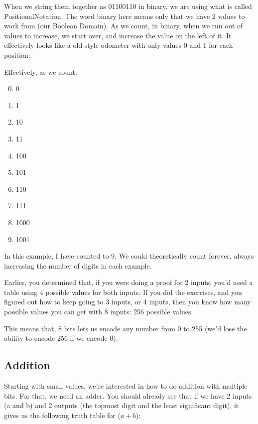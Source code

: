 When we string them together as 01100110 in binary, we are using what is called \gls{PositionalNotation}. The word binary here means only that we have 2 values to work from (our Boolean Domain). As we count, in binary, when we run out of values to increase, we start over, and increase the value on the left of it. It effectively looks like a old-style odometer with only values 0 and 1 for each position:


\begin{samepage}

Effectively, as we count:
\begin{enumerate}
    \setcounter{enumi}{-1}
    \item 0
    \item 1
    \item 10
    \item 11
    \item 100
    \item 101
    \item 110
    \item 111
    \item 1000
    \item 1001
\end{enumerate}

In this example, I have counted to 9. We could theoretically count forever, always increasing the number of digits in each example.
\end{samepage}

Earlier, you determined that, if you were doing a proof for 2 inputs, you'd need a table using 4 possible values for both inputs. If you did the exercises, and you figured out how to keep going to 3 inputs, or 4 inputs, then you know how many possible values you can get with 8 inputs: 256 possible values.

This means that, 8 bits lets us encode any number from 0 to 255 (we'd lose the ability to encode 256 if we encode 0).

\subsection{Addition}
Starting with small values, we're interested in how to do addition with multiple bits. For that, we need an adder. You should already see that if we have 2 inputs (a and b) and 2 outputs (the topmost digit and the least significant digit), it gives us the following truth table for ($a + b$):

